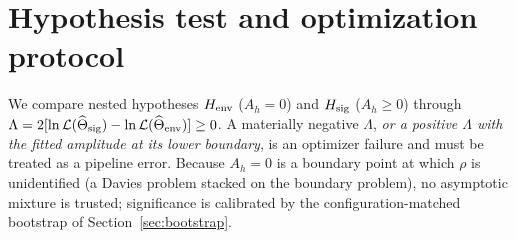 \documentclass[11pt]{article}
\newcommand{\Ah}{A_h}
\begin{document}
\section{Hypothesis test and optimization protocol}
\label{sec:inference}

We compare nested hypotheses $H_{\rm env}$ ($\Ah = 0$) and $H_{\rm sig}$ ($\Ah \ge 0$) through $\Lambda = 2[\ln\mathcal{L}(\widehat{\Theta}_{\rm sig}) - \ln\mathcal{L}(\widehat{\Theta}_{\rm env})] \ge 0$. A materially negative $\Lambda$, \emph{or a positive $\Lambda$ with the fitted amplitude at its lower boundary}, is an optimizer failure and must be treated as a pipeline error. Because $\Ah = 0$ is a boundary point at which $\rho$ is unidentified (a Davies problem stacked on the boundary problem), no asymptotic mixture is trusted; significance is calibrated by the configuration-matched bootstrap of Section~\ref{sec:bootstrap}.
\end{document}
